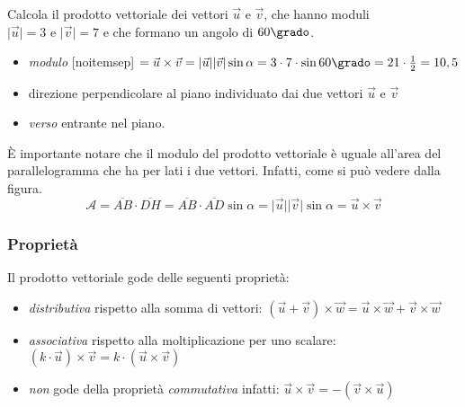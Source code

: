  \begin{esempio}
  Calcola il prodotto vettoriale dei  vettori \(\vec{u}\) e \(\vec{v}\), 
  che hanno moduli \(\lvert\vec{u}\rvert= 3 \text{ e } \lvert\vec{v}\rvert=7\) 
  e che formano un angolo di \(60\grado\). 
 \begin{itemize}
  \item \emph{modulo}  [noitemsep] 
  \(= \vec{u} \times \vec{v} = 
    \lvert\vec{u}\rvert\lvert\vec{v}\rvert \sin \alpha=
    3 \cdot 7 \cdot \sin 60\grado = 21 \cdot \frac{1}{2} = 10,5\)
  \item direzione perpendicolare al piano individuato dai due 
   vettori \(\vec{u}\) e \(\vec{v}\)
  \item \emph{verso} entrante nel piano.
 \end{itemize}
 \end{esempio}

\osservazione
\mbox{}

\begin{minipage}{.59 \textwidth}
È importante notare  che il modulo del prodotto vettoriale è uguale all'area 
del parallelogramma che ha per lati i due vettori.
Infatti, come si può vedere dalla figura.%
\[\mathcal{A} = \overline{AB} \cdot \overline{DH} =
            \overline{AB} \cdot \overline{AD} \sin \alpha =
            \lvert\vec{u}\rvert\lvert\vec{v}\rvert \sin \alpha=
            \vec{u} \times \vec{v}\]
\end{minipage}
\hfill
\begin{minipage}{.39 \textwidth}
\begin{center}
\begin{inaccessibleblock}
  
\end{inaccessibleblock}
\end{center}
\end{minipage}
     

\subsubsection{Proprietà}

Il prodotto vettoriale gode delle seguenti proprietà:
\begin{itemize} [noitemsep]
 \item \emph{distributiva} rispetto alla somma di vettori: \hfill
  \(\displaystyle\left(\vec{u} + \vec{v} \right) \times \vec{w} = 
    \vec{u} \times \vec{w} + \vec{v} \times \vec{w}\)
 \item \emph{associativa} rispetto alla moltiplicazione
  per uno scalare: \hfill
  \(\displaystyle\left(k \cdot \vec{u} \right) \times \vec{v} = 
    k \cdot \left(\vec{u} \times \vec{v} \right)\)
 \item \emph{non} gode della proprietà \emph{commutativa} infatti: \hfill
  \(\displaystyle\vec{u} \times \vec{v} = 
  - \left(\vec{v} \times \vec{u}\right)\)
\end{itemize}

